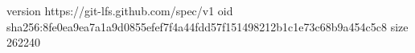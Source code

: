 version https://git-lfs.github.com/spec/v1
oid sha256:8fe0ea9ea7a1a9d0855efef7f4a44fdd57f151498212b1c1e73c68b9a454c5c8
size 262240
